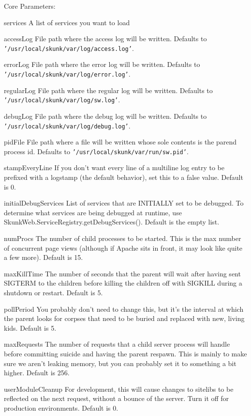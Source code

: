 \documentclass[titlepage]{manual}
\begin{document}
Core Parameters:
\begin{argdesc}
\item[services] \nonscope A list of services you want to load
\item[accessLog] File path where the access log will be written.
Defaults to \texttt{'/usr/local/skunk/var/log/access.log'}.
\item[errorLog] File path where the error log will be written.
Defaults to \texttt{'/usr/local/skunk/var/log/error.log'}.
\item[regularLog] File path where the regular log will be written.
Defaults to \texttt{'/usr/local/skunk/var/log/sw.log'}.
\item[debugLog] File path where the debug log will be written.
Defaults to \texttt{'/usr/local/skunk/var/log/debug.log'}.
\item[pidFile] \nonscope File path where a file will be written whose sole contents is the parend process id.  Defaults to \texttt{'/usr/local/skunk/var/run/sw.pid'}.
\item[stampEveryLine] If you don't want every line of a multiline log entry
to be prefixed with a logstamp (the default behavior), set this to a
false value.  Default is 0.
\item[initialDebugServices] \nonscope List of services that are INITIALLY set to
be debugged.  To determine what services are being debugged at
runtime, use SkunkWeb.ServiceRegistry.getDebugServices().  Default is the empty list.
\item[numProcs] \nonscope
The number of child processes to be started.  This is the max number
of concurrent page views (although if Apache sits in front, it may
look like quite a few more).
Default is 15.

\item[maxKillTime] \nonscope
The number of seconds that the parent will wait after having sent
SIGTERM to the children before killing the children off with SIGKILL
during a shutdown or restart.  Default is 5.
\item[pollPeriod] \nonscope
You probably don't need to change this, but it's the interval at which
the parent looks for corpses that need to be buried and replaced with
new, living kids.
Default is 5.
\item[maxRequests] \nonscope
The number of requests that a child server process will handle before
committing suicide and having the parent respawn.  This is mainly to
make sure we aren't leaking memory, but you can probably set it to
something a bit higher.
Default is 256.
\item[userModuleCleanup] \nonscope
For development, this will cause changes to sitelibs to be reflected
on the next request, without a bounce of the server.  Turn it off
for production environments.
Default is 0.
\end{argdesc}
\end{document}
